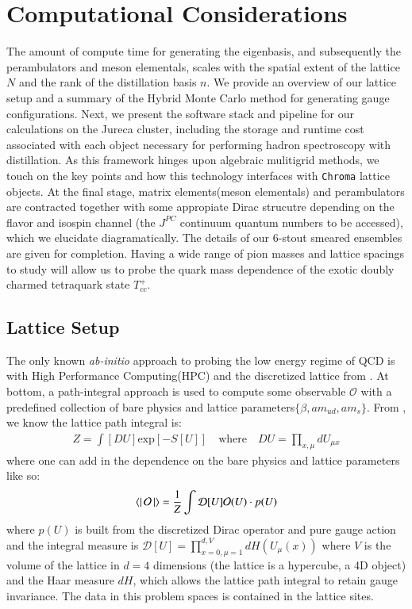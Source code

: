\chapter{Computational Considerations}
\label{sec:comp}
The amount of compute time for generating the eigenbasis, and subsequently the perambulators and meson elementals, scales with the spatial extent of the lattice $N$ and the rank of the distillation basis $n$. We provide an overview of our lattice setup and a summary of the Hybrid Monte Carlo method for generating gauge configurations. Next, we present the software stack and pipeline for our calculations on the Jureca cluster, including the storage and runtime cost associated with each object necessary for performing hadron spectroscopy with distillation. As this framework hinges upon algebraic mulitigrid methods, we touch on the key points and how this technology interfaces with \texttt{Chroma} lattice objects. At the final stage, matrix elements(meson elementals) and perambulators are contracted together with some appropiate Dirac strucutre depending on the flavor and isospin channel (the $J^{PC}$ continuum quantum numbers to be accessed), which we elucidate diagramatically. The details of our 6-stout smeared ensembles are given for completion. Having a wide range of pion masses and lattice spacings to study will allow us to probe the quark mass dependence of the exotic doubly charmed tetraquark state $T_{cc}^+$.   

\section{Lattice Setup}
The only known \textit{ab-initio} approach to probing the low energy regime of QCD is with High Performance Computing(HPC) and the discretized lattice from . At bottom, a path-integral approach is used to compute some observable $\mathcal{O}$ with a predefined collection of bare physics and lattice parameters$\{\beta,am_{ud},am_s\}$. From , we know the lattice path integral is:
\begin{align}
  Z = \int [DU] \text{exp}\left[-S[U]\right] \quad \text{where} \quad  DU = \prod_{x,\mu}^{} dU_{\mu x}
\end{align} where one can add in the dependence on the bare physics and lattice parameters like so: 
\begin{equation}
  \bra{}\mathcal{O}\ket{} = \frac{1}{Z} \int \mathcal{D}[U] \mathcal{O}(U) \cdot p(U)
\end{equation} where $p(U)$ is built from the discretized Dirac operator and pure gauge action and the integral measure is $\mathcal{D}[U] = \prod_{x=0,\mu=1}^{d,V} dH(U_\mu(x))$ where $V$ is the volume of the lattice in $d=4$ dimensions (the lattice is a hypercube, a 4D object) and the Haar measure $dH$, which allows the lattice path integral to retain gauge invariance. The data in this problem spaces is contained in the lattice sites. 

